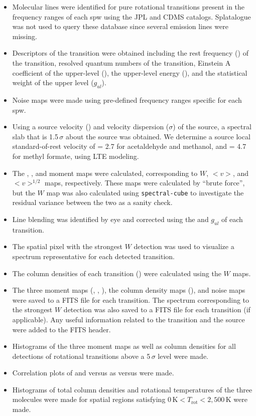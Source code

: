 \documentclass[iop,twocolappendix]{emulateapj}
\begin{document}
\begin{itemize}
\item Molecular lines were identified for pure rotational transitions present in the frequency ranges of each spw using the JPL and CDMS catalogs. Splatalogue was not used to query these database since several emission lines were missing.
\item Descriptors of the transition were obtained including the rest frequency (\restfreq) of the transition, resolved quantum numbers of the transition, Einstein A coefficient of the upper-level (\Aul), the upper-level energy (\Eul), and the statistical weight of the upper level ($g_{ul}$).
\item Noise maps were made using pre-defined frequency ranges specific for each spw.
\item Using a source velocity (\vLSR) and velocity dispersion ($\sigma$) of the source, a spectral slab that is 1.5\,$\sigma$ about the source {\vLSR} was obtained. We determine a source local standard-of-rest velocity of {\vLSR} = 2.7 {\kms} for acetaldehyde and methanol, and {\vLSR} = 4.7 {\kms} for methyl formate, using LTE modeling.
\item The {\momzero}, {\momone}, and {\momtwo} moment maps were calculated, corresponding to $W$, $<v>$, and $<v>^{1/2}$ maps, respectively. These maps were calculated by ``brute force'', but the $W$ map was also calculated using {\tt spectral-cube} to investigate the residual variance between the two as a sanity check. 
\item Line blending was identified by eye and corrected using the {\Aul} and $g_{ul}$ of each transition.
\item The spatial pixel with the strongest $W$ detection was used to visualize a spectrum representative for each detected transition. 
\item The column densities of each transition (\Nthin) were calculated using the $W$ maps. 
\item The three moment maps ({\momzero}, {\momone}, {\momtwo}), the column density maps (\Nthin), and noise maps were saved to a FITS file for each transition. The spectrum corresponding to the strongest $W$ detection was also saved to a FITS file for each transition (if applicable). Any useful information related to the transition and the source were added to the FITS header.
\item Histograms of the three moment maps as well as column densities for all detections of rotational transitions above a 5\,$\sigma$ level were made.
\item Correlation plots of {\vLSR} and {\dispersion} versus {\Eul} as {\vLSR} versus {\dispersion} were made.
\item Histograms of total column densities and rotational temperatures of the three molecules were made for spatial regions satisfying $0\,\mathrm{K} < T_\mathrm{rot} < 2,500\,\mathrm{K}$ were made.
\end{itemize}
\end{document}
